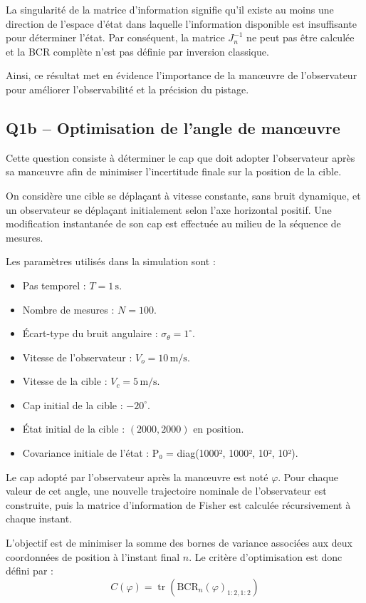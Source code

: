 \documentclass[12pt,a4paper]{article}
\begin{document}
La singularité de la matrice d'information signifie qu'il existe au moins une direction de l'espace d'état dans laquelle l'information disponible est insuffisante pour déterminer l'état. Par conséquent, la matrice \(J_n^{-1}\) ne peut pas être calculée et la BCR complète n'est pas définie par inversion classique.

Ainsi, ce résultat met en évidence l’importance de la manœuvre de l’observateur pour améliorer l’observabilité et la précision du pistage.

\subsection{Q1b -- Optimisation de l'angle de manœuvre}

Cette question consiste à déterminer le cap que doit adopter l'observateur après sa manœuvre afin de minimiser l'incertitude finale sur la position de la cible.

On considère une cible se déplaçant à vitesse constante, sans bruit dynamique, et un observateur se déplaçant initialement selon l'axe horizontal positif. Une modification instantanée de son cap est effectuée au milieu de la séquence de mesures.

Les paramètres utilisés dans la simulation sont :
\begin{itemize}
    \item Pas temporel : $T=1\,\mathrm{s}$.
    \item Nombre de mesures : $N=100$.
    \item Écart-type du bruit angulaire : $\sigma_\theta=1^\circ$.
    \item Vitesse de l'observateur : $V_o=10\,\mathrm{m/s}$.
    \item Vitesse de la cible : $V_c=5\,\mathrm{m/s}$.
    \item Cap initial de la cible : $-20^\circ$.
    \item État initial de la cible : $(2000,2000)$ en position.
    \item Covariance initiale de l’état : P₀ = diag(1000², 1000², 10², 10²).
\end{itemize}

Le cap adopté par l'observateur après la manœuvre est noté $\varphi$. Pour chaque valeur de cet angle, une nouvelle trajectoire nominale de l'observateur est construite, puis la matrice d'information de Fisher est calculée récursivement à chaque instant.

L'objectif est de minimiser la somme des bornes de variance associées aux deux coordonnées de position à l'instant final $n$. Le critère d'optimisation est donc défini par :
\begin{equation}
\boxed{
C(\varphi)=
\operatorname{tr}
\left(
\mathrm{BCR}_n(\varphi)_{1:2,1:2}
\right)
}
\end{equation}
\end{document}
